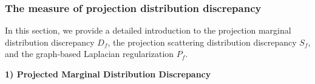 \documentclass[a4paper]{cas-sc}
\newtheorem{remark}{Remark}
\begin{document}



\subsubsection{The measure of projection distribution discrepancy}\label{measure}
In this section, we provide a detailed introduction to the projection marginal distribution discrepancy $D_f$, the projection scattering distribution discrepancy $S_f$, and the graph-based Laplacian regularization $P_f$.


\textbf{ 1) Projected Marginal Distribution Discrepancy}
\end{document}

